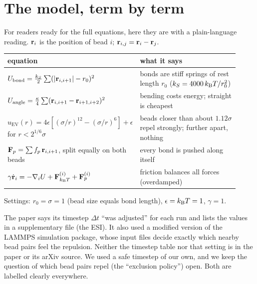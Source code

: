 \documentclass[11pt]{article}
\begin{document}
\section{The model, term by term}
For readers ready for the full equations, here they are with a plain-language reading. $\mathbf{r}_i$ is the position of bead $i$; $\mathbf{r}_{i,j}=\mathbf{r}_i-\mathbf{r}_j$.
\begin{center}\small
\begin{tabular}{p{0.44\linewidth}p{0.48\linewidth}}\toprule equation & what it says\\ \midrule
$U_\mathrm{bond}=\frac{k_S}{2}\sum(|\mathbf{r}_{i,i+1}|-r_0)^2$ & bonds are stiff springs of rest length $r_0$ ($k_S=4000\,k_{\mathrm{B}}T/r_0^2$) \\
$U_\mathrm{angle}=\frac{\kappa}{4}\sum(\mathbf{r}_{i,i+1}-\mathbf{r}_{i+1,i+2})^2$ & bending costs energy; straight is cheapest \\
$u_\mathrm{EV}(r)=4\epsilon[(\sigma/r)^{12}-(\sigma/r)^{6}]+\epsilon$ for $r<2^{1/6}\sigma$ & beads closer than about $1.12\sigma$ repel strongly; further apart, nothing \\
$\mathbf{F}_p=\sum f_p\,\mathbf{r}_{i,i+1}$, split equally on both beads & every bond is pushed along itself \\
$\gamma\dot{\mathbf{r}}_i=-\nabla_iU+\mathbf{F}^{(i)}_{k_{\mathrm{B}}T}+\mathbf{F}^{(i)}_p$ & friction balances all forces (overdamped) \\ \bottomrule
\end{tabular}
\end{center}
Settings: $r_0=\sigma=1$ (bead size equals bond length), $\epsilon=k_{\mathrm{B}}T=1$, $\gamma=1$.

\begin{warnbox}[title=Two numbers we do not have]
The paper says its timestep $\Delta t$ ``was adjusted'' for each run and lists the values in a supplementary file (the ESI). It also used a modified version of the LAMMPS simulation package, whose input files
decide exactly which nearby bead pairs feel the repulsion. Neither the timestep table nor that setting is in the paper or its arXiv source. We used a safe timestep of our own,
and we keep the question of which bead pairs repel (the ``exclusion policy'') open. Both are labelled clearly everywhere.
\end{warnbox}

\end{document}
